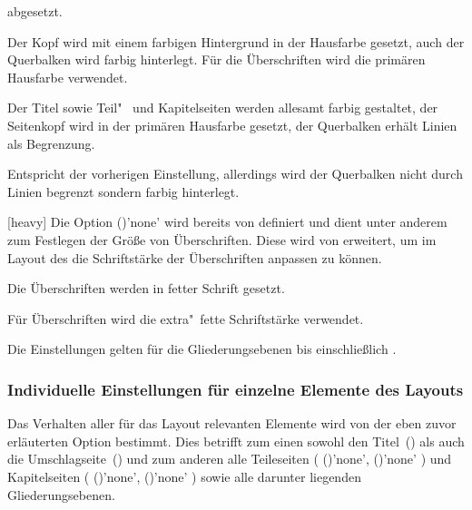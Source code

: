 \begin{Declaration*}{}
\begin{Declaration*}{}
\begin{Declaration*}{}
\begin{Declaration}
\begin{values}{}
  abgesetzt.
\item[bicolor/bichrome]
  Der Kopf wird mit einem farbigen Hintergrund in der Hausfarbe gesetzt, auch 
  der Querbalken wird farbig hinterlegt. Für die Überschriften wird die 
  primären Hausfarbe verwendet.
\item[color]
  Der Titel sowie Teil"~ und Kapitelseiten werden allesamt farbig gestaltet, 
  der Seitenkopf wird in der primären Hausfarbe  gesetzt, der 
  Querbalken erhält Linien als Begrenzung.
\item[fullcolor/full]
  Entspricht der vorherigen Einstellung, allerdings wird der Querbalken nicht 
  durch Linien begrenzt sondern farbig hinterlegt.
\end{values}
\end{Declaration}

\begin{Declaration}[v2.06]{}[heavy]
\printdeclarationlist%
%
%
Die Option ()'none' wird bereits 
von \KOMAScript{} definiert und dient unter anderem zum Festlegen der Größe von 
Überschriften. Diese wird von \TUDScript erweitert, um im Layout des \CDs die 
Schriftstärke der Überschriften anpassen zu können.
%
\begin{values}{}
\item[light/normalbold]
  Die Überschriften werden in fetter Schrift gesetzt.
\item[heavy/ultrabold]
  Für Überschriften wird die extra"~fette Schriftstärke verwendet.
\end{values}
%
Die Einstellungen gelten für die Gliederungsebenen bis einschließlich 
.
\end{Declaration}


\subsubsection{Individuelle Einstellungen für einzelne Elemente des Layouts}
Das Verhalten aller für das Layout relevanten Elemente wird von der eben zuvor 
erläuterten Option  bestimmt. Dies betrifft zum einen sowohl 
den Titel~() als auch die Umschlagseite~() 
und zum anderen alle Teileseiten
(%
  ()'none', 
  ()'none'%
)
und Kapitelseiten 
(%
  ()'none', 
  ()'none'%
)
sowie alle darunter liegenden Gliederungsebenen.


\end{Declaration*}
\end{Declaration*}
\end{Declaration*}
